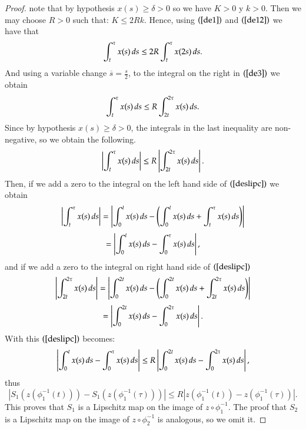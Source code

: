 \documentclass{amsart}
\begin{document}
\begin{proof}
\noindent note that by hypothesis $x(s)\geq \delta > 0$ so we have $K>0$ y $k>0$. Then we may choose $R > 0$ such that: $K\leq 2Rk$. Hence, using $(\ref{de1})$ and $(\ref{de12})$ we have that
 \begin{equation}\label{de3}
     \int_{t}^{\tau} x(s)\thinspace ds\leq 2R\int_{t}^{\tau} x(2s)\thinspace ds.
 \end{equation}
 And using a variable change $\overline{s}=\frac{s}{2}$, to the integral on the right in $(\ref{de3})$ we obtain
 \begin{equation*}
     \int_{t}^{\tau} x(s)\thinspace ds\leq R\int_{2t}^{2\tau} x(s)\thinspace  ds.
 \end{equation*}
Since by hypothesis $x(s)\geq \delta > 0$, the integrals in the last inequality are non-negative, so we obtain the following. 
 \begin{equation}\label{deslipc}
     \left|\int_{t}^{\tau} x(s)\thinspace ds\right|\leq R \left|\int_{2t}^{2\tau} x(s)\thinspace ds\right|.
 \end{equation}
Then, if we add a zero to the integral on the left hand side of $(\ref{deslipc})$ we obtain
 \begin{equation*}
     \left|\int_{t}^{\tau} x(s)\thinspace ds\right|=\left|\int_{0}^{t} x(s)\thinspace ds -\left(\int_{0}^{t} x(s)\thinspace ds+\int_{t}^{\tau} x(s)\thinspace ds\right)\right|
 \end{equation*}
 \begin{equation*}
     =\left|\int_{0}^{t} x(s)\thinspace ds -\int_{0}^{\tau} x(s)\thinspace ds\right|,
 \end{equation*}
 and if we add a zero to the integral on right hand side of $(\ref{deslipc})$
 \begin{equation*}
     \left|\int_{2t}^{2\tau} x(s)\thinspace ds\right|=\left|\int_{0}^{2t} x(s)\thinspace ds-\left(\int_{0}^{2t} x(s)\thinspace ds+\int_{2t}^{2\tau} x(s)\thinspace  ds\right)\right|
 \end{equation*}
 \begin{equation*}
      =\left|\int_{0}^{2t} x(s)\thinspace ds-\int_{0}^{2\tau} x(s)\thinspace ds\right|.
 \end{equation*}
 With this $(\ref{deslipc})$ becomes:
 \begin{equation*}
     \left|\int_{0}^{t} x(s)\thinspace ds -\int_{0}^{\tau} x(s)\thinspace ds\right|\leq R \left|\int_{0}^{2t} x(s)\thinspace ds-\int_{0}^{2\tau} x(s)\thinspace ds\right|,
 \end{equation*}
 thus
 \begin{equation*}
     |S_1(z(\phi^{-1}_1(t)))-S_1(z(\phi^{-1}_1(\tau)))|\leq R|z(\phi^{-1}_1(t))-z(\phi^{-1}_1(\tau))|.
 \end{equation*}
This proves that $S_1$ is a Lipschitz map on the  image of $z\circ\phi^{-1}_1$.  The proof that $S_2$  is a  Lipschitz map on the image of $z\circ \phi^{-1}_2$ is analogous, so we omit it.


\end{proof}
\end{document}
